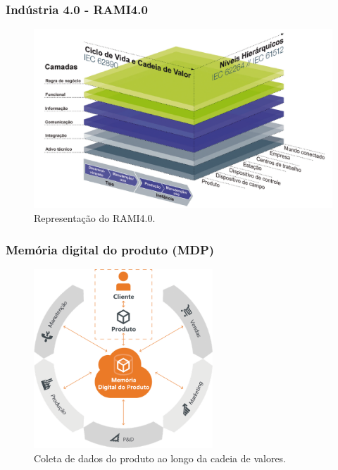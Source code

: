 \documentclass[10pt]{beamer}
\begin{document}
\begin{frame}
	\frametitle{Indústria 4.0 - RAMI4.0}
	
	\begin{figure}[htb]
		\centering
		\caption{Representação do RAMI4.0.}
		\label{fig:rami4}
		\includegraphics[width=1\textwidth]{rami4.png}
	\end{figure}
	
\end{frame}
\begin{frame}
	\frametitle{Memória digital do produto (MDP)}

	\begin{figure}[htb]
		\centering
		\caption{Coleta de dados do produto ao longo da cadeia de valores.}
		\label{fig:mdp}
		\includegraphics[width=0.6\textwidth]{mdp.png}
	\end{figure}
	 	
\end{frame}
\end{document}
